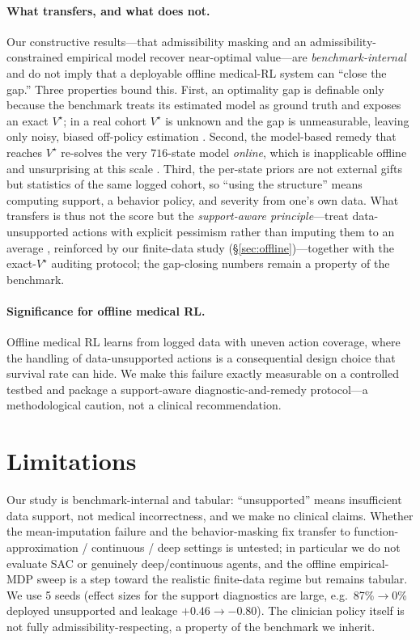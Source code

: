 \documentclass{article}
\begin{document}
\paragraph{What transfers, and what does not.}
Our constructive results---that admissibility masking and an
admissibility-constrained empirical model recover near-optimal value---are
\emph{benchmark-internal} and do not imply that a deployable offline medical-RL
system can ``close the gap.'' Three properties bound this. First, an optimality gap
is definable only because the benchmark treats its estimated model as ground truth
and exposes an exact $V^\star$; in a real cohort $V^\star$ is unknown and the gap is
unmeasurable, leaving only noisy, biased off-policy estimation
\citep{gottesman2019guidelines}. Second, the model-based remedy that reaches
$V^\star$ re-solves the very $716$-state model \emph{online}, which is inapplicable
offline and unsurprising at this scale \citep{auer2008ucrl,osband2013psrl}. Third,
the per-state priors are not external gifts but statistics of the same logged cohort,
so ``using the structure'' means computing support, a behavior policy, and severity
from one's own data. What transfers is thus not the score but the
\emph{support-aware principle}---treat data-unsupported actions with explicit
pessimism rather than imputing them to an average \citep{fujimoto2019bcq,kumar2020cql},
reinforced by our finite-data study (\S\ref{sec:offline})---together with the
exact-$V^\star$ auditing protocol; the gap-closing numbers remain a property of the
benchmark.

\paragraph{Significance for offline medical RL.}
Offline medical RL learns from logged data with uneven action coverage, where the
handling of data-unsupported actions is a consequential design choice that survival
rate can hide. We make this failure exactly measurable on a controlled testbed and
package a support-aware diagnostic-and-remedy protocol---a methodological caution,
not a clinical recommendation.

\section{Limitations}
\label{sec:limitations}
Our study is benchmark-internal and tabular: ``unsupported'' means insufficient data
support, not medical incorrectness, and we make no clinical claims. Whether the
mean-imputation failure and the behavior-masking fix transfer to function-approximation
/ continuous / deep settings is untested; in particular we do not evaluate SAC or
genuinely deep/continuous agents, and the offline empirical-MDP sweep is a step
toward the realistic finite-data regime but remains tabular. We use 5 seeds (effect
sizes for the support diagnostics are large, e.g.\ 87\%$\to$0\% deployed unsupported
and leakage $+0.46\to-0.80$). The clinician policy itself is not fully
admissibility-respecting, a property of the benchmark we inherit.
\end{document}
